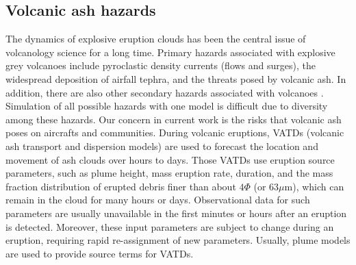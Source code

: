 \documentclass[journal abbreviation, manuscript]{copernicus}
\begin{document}
\subsection{Volcanic ash hazards}
The dynamics of explosive eruption clouds has been the central issue of volcanology science for a long time. Primary hazards associated with explosive grey volcanoes include pyroclastic density currents (flows and surges), the widespread deposition of airfall tephra, and the threats posed by volcanic ash. In addition, there are also other secondary hazards associated with volcanoes \citep{lockwood2013volcanoes}.
Simulation of all possible hazards with one model is difficult due to diversity among these hazards. Our concern in current work is the risks that volcanic ash poses on aircrafts and communities. During volcanic eruptions, VATDs (volcanic ash transport and dispersion models) are used to forecast the location and movement of ash clouds over hours to days. Those VATDs use eruption source parameters, such as plume height, mass eruption rate, duration, and the mass fraction distribution of erupted debris finer than about $4 \Phi$ (or $63  \mu$m), which can remain in the cloud for many hours or days. Observational data for such parameters are usually unavailable in the first minutes or hours after an eruption is detected. Moreover, these input parameters are subject to change during an eruption, requiring rapid re-assignment of new parameters. Usually, plume models are used to provide source terms for VATDs. 
%
\end{document}
